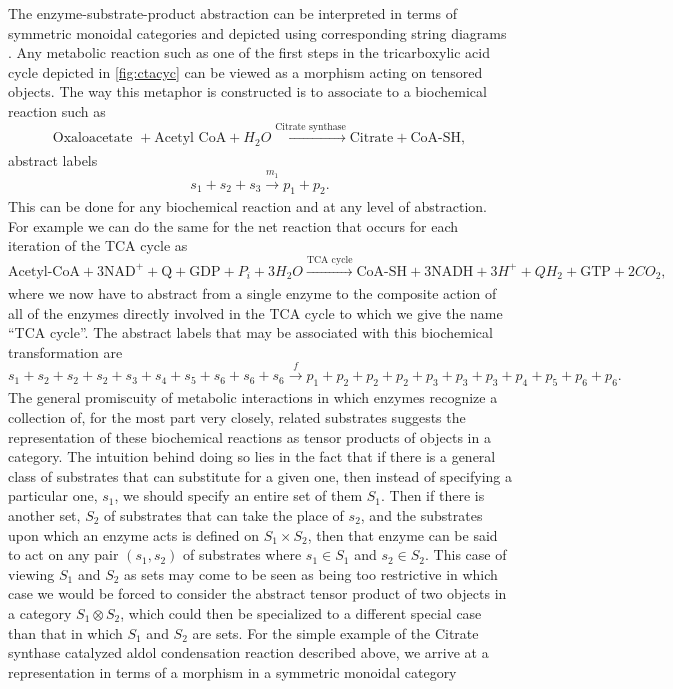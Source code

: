 The enzyme-substrate-product abstraction can be interpreted in terms of symmetric monoidal categories and depicted using corresponding string diagrams \cite{Co2010}. Any metabolic reaction such as one of the first steps in the tricarboxylic acid cycle depicted in \ref{fig:ctacyc} can be viewed as a morphism acting on tensored objects. The way this metaphor is constructed is to associate to a biochemical reaction such as
$$
\text{Oxaloacetate } + \text{Acetyl CoA} + H_2O \xrightarrow[]{\text{Citrate synthase}} \text{Citrate} + \text{CoA-SH},
$$
abstract labels
$$
s_1 + s_2 + s_3 \xrightarrow[]{m_1} p_1 + p_2.
$$
This can be done for any biochemical reaction and at any level of abstraction. For example we can do the same for the net reaction that occurs for each iteration of the TCA cycle as
$$
\text{Acetyl-CoA} + 3 \text{NAD}^+ + \text{Q} + \text{GDP} + P_i + 3 H_2O \xrightarrow[]{\text{TCA cycle}} \text{CoA-SH} + 3 \text{NADH} + 3H^+ + QH_2 + \text{GTP} + 2 CO_2,
$$
where we now have to abstract from a single enzyme to the composite action of all of the enzymes directly involved in the TCA cycle to which we give the name ``TCA cycle''. The abstract labels that may be associated with this biochemical transformation are
$$
s_1 + s_2 + s_2 + s_2 + s_3 + s_4 + s_5 + s_6 + s_6 + s_6 \xrightarrow[]{f} p_1 + p_2 + p_2 + p_2 + p_3 + p_3  + p_3 + p_4 + p_5 + p_6 + p_6.
$$
The general promiscuity of metabolic interactions in which enzymes recognize a collection of, for the most part very closely, related substrates suggests the representation of these biochemical reactions as tensor products of objects in a category. The intuition behind doing so lies in the fact that if there is a general class of substrates that can substitute for a given one, then instead of specifying a particular one, $s_1$, we should specify an entire set of them $S_1$. Then if there is another set, $S_2$ of substrates that can take the place of $s_2$, and the substrates upon which an enzyme acts is defined on $S_1 \times S_2$, then that enzyme can be said to act on any pair $(s_1,s_2)$ of substrates where $s_1 \in S_1$ and $s_2 \in S_2$. This case of viewing $S_1$ and $S_2$ as sets may come to be seen as being too restrictive in which case we would be forced to consider the abstract tensor product of two objects in a category $S_1 \otimes S_2$, which could then be specialized to a different special case than that in which $S_1$ and $S_2$ are sets. For the simple example of the Citrate synthase catalyzed aldol condensation reaction described above, we arrive at a representation in terms of a morphism in a symmetric monoidal category
